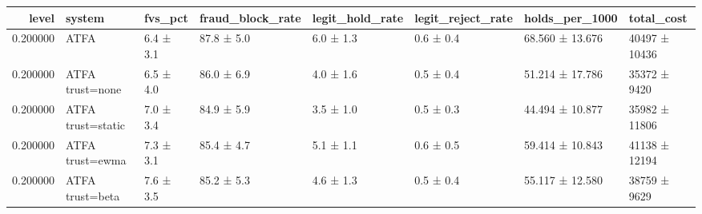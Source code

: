 \begin{tabular}{rlllllll}
\toprule
level & system & fvs\_pct & fraud\_block\_rate & legit\_hold\_rate & legit\_reject\_rate & holds\_per\_1000 & total\_cost \\
\midrule
0.200000 & ATFA & 6.4 ± 3.1 & 87.8 ± 5.0 & 6.0 ± 1.3 & 0.6 ± 0.4 & 68.560 ± 13.676 & 40497 ± 10436 \\
0.200000 & ATFA trust=none & 6.5 ± 4.0 & 86.0 ± 6.9 & 4.0 ± 1.6 & 0.5 ± 0.4 & 51.214 ± 17.786 & 35372 ± 9420 \\
0.200000 & ATFA trust=static & 7.0 ± 3.4 & 84.9 ± 5.9 & 3.5 ± 1.0 & 0.5 ± 0.3 & 44.494 ± 10.877 & 35982 ± 11806 \\
0.200000 & ATFA trust=ewma & 7.3 ± 3.1 & 85.4 ± 4.7 & 5.1 ± 1.1 & 0.6 ± 0.5 & 59.414 ± 10.843 & 41138 ± 12194 \\
0.200000 & ATFA trust=beta & 7.6 ± 3.5 & 85.2 ± 5.3 & 4.6 ± 1.3 & 0.5 ± 0.4 & 55.117 ± 12.580 & 38759 ± 9629 \\
\bottomrule
\end{tabular}
